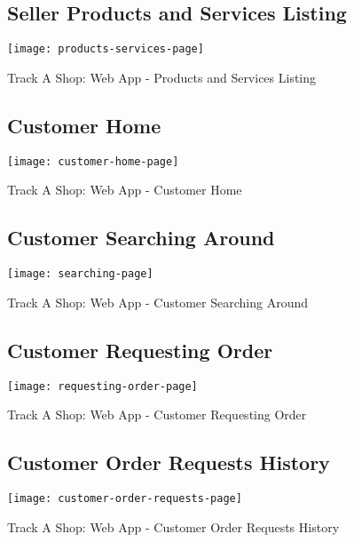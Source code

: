 \begin{figure}[h]
	\subsection{Seller Products and Services Listing}
	\centering
	\texttt{[image: products-services-page]}
	\caption{Track A Shop: Web App - Products and Services Listing}
\end{figure}


\begin{figure}[h]
	\subsection{Customer Home \\}
	\centering
	\texttt{[image: customer-home-page]}
	\caption{Track A Shop: Web App - Customer Home}
\end{figure}
\newpage

\begin{figure}[h]
	\subsection{Customer Searching Around \\}
	\centering
	\texttt{[image: searching-page]}
	\caption{Track A Shop: Web App - Customer Searching Around}
\end{figure}

\vspace{1cm}

\begin{figure}[h]
	\subsection{Customer Requesting Order \\}
	\centering
	\texttt{[image: requesting-order-page]}
	\caption{Track A Shop: Web App - Customer Requesting Order}
\end{figure}
\newpage

\begin{figure}[h]
	\subsection{Customer Order Requests History \\}
	\centering
	\texttt{[image: customer-order-requests-page]}
	\caption{Track A Shop: Web App - Customer Order Requests History}
\end{figure}

